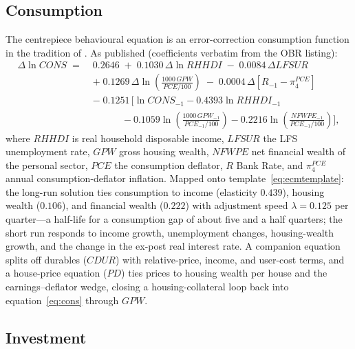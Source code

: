 \subsection{Consumption}

The centrepiece behavioural equation is an error-correction consumption function in the tradition of \citet{davidson1978}. As published (coefficients verbatim from the OBR listing):
\begin{equation}
\begin{aligned}
\Delta \ln CONS \;=\;& 0.2646 \;+\; 0.1030\,\Delta \ln RHHDI \;-\; 0.0084\,\Delta LFSUR \\
&+\; 0.1269\,\Delta \ln\!\left(\frac{1000\,GPW}{PCE/100}\right) \;-\; 0.0004\,\Delta\!\left[R_{-1} - \pi^{PCE}_{4}\right] \\
&-\; 0.1251\,\Big[ \ln CONS_{-1} - 0.4393 \ln RHHDI_{-1} \\
&\qquad\quad - 0.1059 \ln\!\left(\tfrac{1000\,GPW_{-1}}{PCE_{-1}/100}\right) - 0.2216 \ln\!\left(\tfrac{NFWPE_{-1}}{PCE_{-1}/100}\right) \Big],
\end{aligned}
\label{eq:cons}
\end{equation}
where $RHHDI$ is real household disposable income, $LFSUR$ the LFS unemployment rate, $GPW$ gross housing wealth, $NFWPE$ net financial wealth of the personal sector, $PCE$ the consumption deflator, $R$ Bank Rate, and $\pi^{PCE}_4$ annual consumption-deflator inflation. Mapped onto template~\eqref{eq:ecmtemplate}: the long-run solution ties consumption to income (elasticity $0.439$), housing wealth ($0.106$), and financial wealth ($0.222$) with adjustment speed $\lambda = 0.125$ per quarter---a half-life for a consumption gap of about five and a half quarters; the short run responds to income growth, unemployment changes, housing-wealth growth, and the change in the ex-post real interest rate. A companion equation splits off durables ($CDUR$) with relative-price, income, and user-cost terms, and a house-price equation ($PD$) ties prices to housing wealth per house and the earnings--deflator wedge, closing a housing-collateral loop back into equation~\eqref{eq:cons} through $GPW$.

\subsection{Investment}

